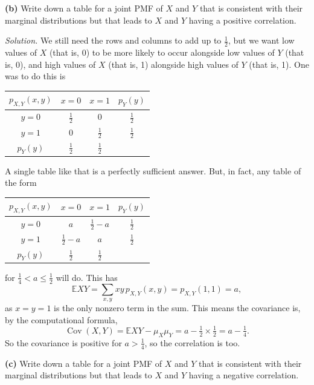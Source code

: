 \documentclass[
  a4paper,
]{book}
\theoremstyle{definition}
\theoremstyle{definition}
\theoremstyle{definition}
\theoremstyle{definition}
\theoremstyle{remark}
\begin{document}
\textbf{(b)} Write down a table for a joint PMF of \(X\) and \(Y\) that is consistent with their marginal distributions but that leads to \(X\) and \(Y\) having a positive correlation.

\begin{myanswers}
\emph{Solution.}
We still need the rows and columns to add up to \(\frac12\), but we want low values of \(X\) (that is, 0) to be more likely to occur alongside low values of \(Y\) (that is, 0), and high values of \(X\) (that is, 1) alongside high values of \(Y\) (that is, 1). One was to do this is

\begin{longtable}[]{@{}cccc@{}}
\toprule\noalign{}
\(p_{X,Y}(x,y)\) & \(x = 0\) & \(x = 1\) & \(p_Y(y)\) \\
\midrule\noalign{}
\endhead
\bottomrule\noalign{}
\endlastfoot
\(y = 0\) & \(\frac12\) & \(0\) & \(\frac12\) \\
\(y = 1\) & \(0\) & \(\frac12\) & \(\frac12\) \\
\(p_Y(y)\) & \(\frac12\) & \(\frac12\) & \\
\end{longtable}

A single table like that is a perfectly sufficient answer. But, in fact, any table of the form

\begin{longtable}[]{@{}cccc@{}}
\toprule\noalign{}
\(p_{X,Y}(x,y)\) & \(x = 0\) & \(x = 1\) & \(p_Y(y)\) \\
\midrule\noalign{}
\endhead
\bottomrule\noalign{}
\endlastfoot
\(y = 0\) & \(a\) & \(\frac12 - a\) & \(\frac12\) \\
\(y = 1\) & \(\frac12 - a\) & \(a\) & \(\frac12\) \\
\(p_Y(y)\) & \(\frac12\) & \(\frac12\) & \\
\end{longtable}

for \(\frac14 < a \leq \frac12\) will do. This has
\[ \mathbb EXY = \sum_{x,y} xy\, p_{X,Y}(x,y) = p_{X,Y}(1, 1) = a , \]
as \(x = y = 1\) is the only nonzero term in the sum. This means the covariance is, by the computational formula,
\[ \operatorname{Cov}(X,Y) = \mathbb EXY - \mu_X \mu_Y = a - \tfrac12 \times \tfrac12 = a - \tfrac14 . \]
So the covariance is positive for \(a > \frac14\), so the correlation is too.

\end{myanswers}

\textbf{(c)} Write down a table for a joint PMF of \(X\) and \(Y\) that is consistent with their marginal distributions but that leads to \(X\) and \(Y\) having a negative correlation.
\end{document}
